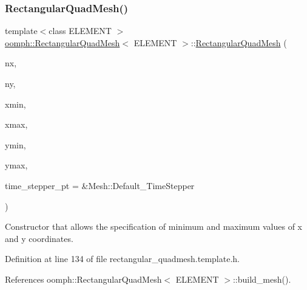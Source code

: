 \subsubsection{\texorpdfstring{Rectangular\+Quad\+Mesh()}{RectangularQuadMesh()}\hspace{0.1cm}{\footnotesize\ttfamily [3/5]}}
{\footnotesize\ttfamily template$<$class E\+L\+E\+M\+E\+NT $>$ \\
\hyperlink{classoomph_1_1RectangularQuadMesh}{oomph\+::\+Rectangular\+Quad\+Mesh}$<$ E\+L\+E\+M\+E\+NT $>$\+::\hyperlink{classoomph_1_1RectangularQuadMesh}{Rectangular\+Quad\+Mesh} (\begin{DoxyParamCaption}\item[{const unsigned \&}]{nx,  }\item[{const unsigned \&}]{ny,  }\item[{const double \&}]{xmin,  }\item[{const double \&}]{xmax,  }\item[{const double \&}]{ymin,  }\item[{const double \&}]{ymax,  }\item[{Time\+Stepper $\ast$}]{time\+\_\+stepper\+\_\+pt = {\ttfamily \&Mesh\+:\+:Default\+\_\+TimeStepper} }\end{DoxyParamCaption})\hspace{0.3cm}{\ttfamily [inline]}}



Constructor that allows the specification of minimum and maximum values of x and y coordinates. 



Definition at line 134 of file rectangular\+\_\+quadmesh.\+template.\+h.



References oomph\+::\+Rectangular\+Quad\+Mesh$<$ E\+L\+E\+M\+E\+N\+T $>$\+::build\+\_\+mesh().

\mbox{\label{classoomph_1_1RectangularQuadMesh_a40f120e00d682026e54593ca0f823535}} 
